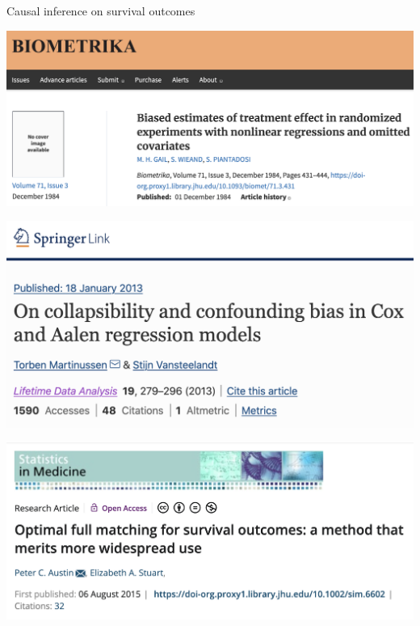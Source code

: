 \documentclass[aspectratio=169,xcolor=dvipsnames]{beamer}					%
\begin{document}
{
\begin{frame}{Causal inference on survival outcomes}
	\begin{minipage}{\linewidth}
	\vspace*{.07\paperheight}
	\includegraphics[width=0.6\linewidth]{figures/gail_et_al_1984}
	\end{minipage}
	\begin{minipage}{\linewidth}
	\raggedleft
	\vspace*{-.15\paperheight}
	\includegraphics[width=0.45\linewidth]{figures/martinussen_vansteelandt_2013}
	\end{minipage}
	\pause
	\begin{minipage}{\linewidth}
	\centering
	\vspace*{-.6\paperheight}
	\includegraphics[width=0.55\linewidth, frame]{figures/austin_stuart_2015}
	\end{minipage}
\end{frame}
}
\end{document}
